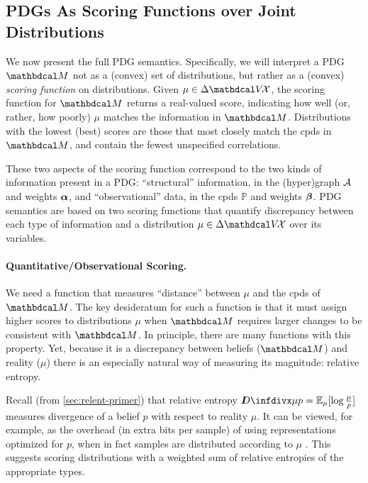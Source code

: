 \subsection{PDGs As Scoring Functions over Joint Distributions}
    \label{sec:scoring-semantics}   

We now present the full PDG semantics. 
Specifically, we will interpret a PDG $\dg M$ 
not as a (convex) set of distributions, but rather as a
(convex) \emph{scoring function} on distributions. 
Given $\mu \in \Delta \V\!\X$, the scoring function for $\dg M$
returns a real-valued score,
indicating how well (or, rather, how poorly) $\mu$ matches the information in $\dg M$. 
Distributions with the lowest (best) scores are those that most closely match the cpds in $\dg M$, and contain the fewest unspecified correlations.



These two aspects of the scoring function correspond 
to the two kinds of information present in a PDG:
``structural'' information, in the (hyper)graph $\mathcal A$ and
weights $\boldsymbol\alpha$, and ``observational'' data,
in the cpds  $\mathbb P$ and weights $\boldsymbol\beta$.
PDG semantics are based on two scoring functions
that quantify discrepancy between 
each type of information and a distribution
$\mu \in \Delta \V \!\X$ over its variables.

\paragraph{Quantitative/Observational Scoring.}
We need a function that measures ``distance'' between $\mu$ and the cpds of $\dg M$.
The key desideratum for such a function is that it must assign higher scores to distributions $\mu$ when $\dg M$ requires larger changes to be consistent with $\dg M$. 
In principle, there are many functions with this property. 
Yet, because it is a discrepancy between beliefs ($\dg M$) and reality ($\mu$)
    there is an especially natural way of measuring its magnitude: relative entropy.

Recall (from \cref{sec:relent-primer}) that relative entropy 
$\kldiv{\mu}{p} = \Ex_{\mu}[\log \frac\mu p]$
measures divergence of a belief $p$ with respect to reality $\mu$.
It can be viewed, for example, as the overhead (in extra bits per sample)
of using representations optimized for $p$, when in fact samples are distributed according to $\mu$ \citep{mackay2003information}.
This suggests scoring distributions with a weighted sum of relative entropies
    of the appropriate types. 


